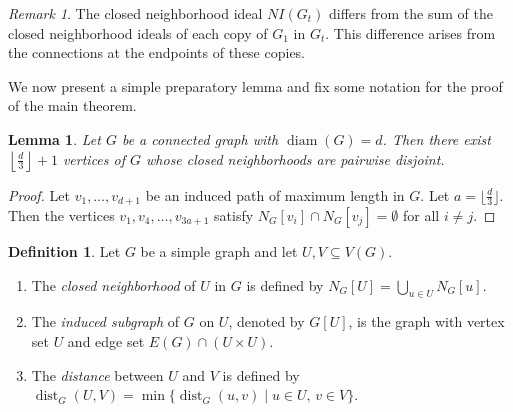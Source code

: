 \documentclass[12pt,reqno,twoside]{amsart}
\DeclareMathOperator{\diam}{diam}
\DeclareMathOperator{\dist}{dist}
\newtheorem{lem}[thm]{\bf Lemma}
\theoremstyle{definition}
\newtheorem{defn}[thm]{\bf Definition}
\theoremstyle{plain}
\theoremstyle{remark}
\newtheorem{rem}[thm]{Remark}
\numberwithin{equation}{section}
\begin{document}
\begin{rem}
The closed neighborhood ideal $NI(G_t)$ differs from the sum of the closed neighborhood ideals of each copy of $G_1$ in $G_t$. This difference arises from the connections at the endpoints of these copies.
\end{rem}


We now present a simple preparatory lemma and fix some notation for the proof of the main theorem.

\begin{lem}\label{lem_disjoint_ind}
Let $G$ be a connected graph with $\diam(G) = d$. Then there exist $\left\lfloor \frac{d}{3} \right\rfloor + 1$ vertices of $G$ whose closed neighborhoods are pairwise disjoint.
\end{lem}

\begin{proof}
Let $v_1, \ldots, v_{d+1}$ be an induced path of maximum length in $G$. Let $a =  \lfloor \frac{d}{3} \rfloor$. Then the vertices $v_1, v_4, \ldots, v_{3a+1}$ satisfy $N_G[v_i] \cap N_G[v_j] = \emptyset$ for all $i \neq j$.
\end{proof}

\begin{defn}
Let $G$ be a simple graph and let $U, V \subseteq V(G)$.
\begin{enumerate}
    \item The \emph{closed neighborhood} of $U$ in $G$ is defined by   \(
    N_G[U] = \bigcup_{u \in U} N_G[u].
    \)
    \item The \emph{induced subgraph} of $G$ on $U$, denoted by $G[U]$, is the graph with vertex set $U$ and edge set $E(G) \cap (U \times U)$.
    \item The \emph{distance} between $U$ and $V$ is defined by
    \(
    \dist_G(U, V) = \min \{ \dist_G(u, v) \mid u \in U,\, v \in V \}.
    \)
\end{enumerate}
\end{defn}
\end{document}
